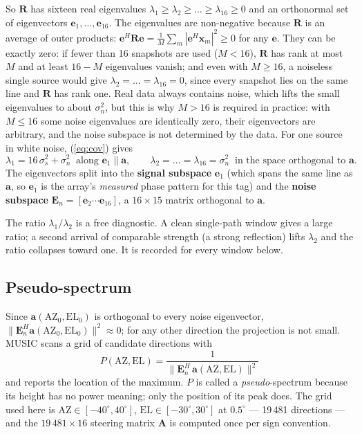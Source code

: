 \documentclass[11pt,a4paper]{article}
\newcommand{\vect}[1]{\mathbf{#1}}
\begin{document}
So $\vect R$ has sixteen real eigenvalues $\lambda_1 \ge \lambda_2 \ge \dots \ge \lambda_{16} \ge 0$ and an orthonormal set of eigenvectors $\vect e_1, \dots, \vect e_{16}$. The eigenvalues are non-negative because $\vect R$ is an average of outer products: $\vect e^H\vect R\vect e = \frac1M\sum_m|\vect e^H\vect x_m|^2 \ge 0$ for any $\vect e$. They can be exactly zero: if fewer than 16 snapshots are used ($M < 16$), $\vect R$ has rank at most $M$ and at least $16-M$ eigenvalues vanish; and even with $M \ge 16$, a noiseless single source would give $\lambda_2 = \dots = \lambda_{16} = 0$, since every snapshot lies on the same line and $\vect R$ has rank one. Real data always contains noise, which lifts the small eigenvalues to about $\sigma_n^2$, but this is why $M > 16$ is required in practice: with $M \le 16$ some noise eigenvalues are identically zero, their eigenvectors are arbitrary, and the noise subspace is not determined by the data. For one source in white noise, (\ref{eq:cov}) gives
\[
  \lambda_1 = 16\,\sigma_s^2 + \sigma_n^2 \ \text{ along } \vect e_1 \parallel \vect a,
  \qquad
  \lambda_2 = \dots = \lambda_{16} = \sigma_n^2 \ \text{ in the space orthogonal to } \vect a.
\]
The eigenvectors split into the \textbf{signal subspace} $\vect e_1$ (which spans the same line as $\vect a$, so $\vect e_1$ is the array's \emph{measured} phase pattern for this tag) and the \textbf{noise subspace} $\vect E_n = [\vect e_2 \cdots \vect e_{16}]$, a $16\times 15$ matrix orthogonal to $\vect a$.

The ratio $\lambda_1/\lambda_2$ is a free diagnostic. A clean single-path window gives a large ratio; a second arrival of comparable strength (a strong reflection) lifts $\lambda_2$ and the ratio collapses toward one. It is recorded for every window below.

\subsection{Pseudo-spectrum}
Since $\vect a(\mathrm{AZ}_0, \mathrm{EL}_0)$ is orthogonal to every noise eigenvector, $\|\vect E_n^H\vect a(\mathrm{AZ}_0, \mathrm{EL}_0)\|^2 \approx 0$; for any other direction the projection is not small. MUSIC scans a grid of candidate directions with
\begin{equation}
  P(\mathrm{AZ}, \mathrm{EL}) = \frac{1}{\|\vect E_n^{H}\,\vect a(\mathrm{AZ}, \mathrm{EL})\|^2}
  \label{eq:music}
\end{equation}
and reports the location of the maximum. $P$ is called a \emph{pseudo}-spectrum because its height has no power meaning; only the position of its peak does. The grid used here is $\mathrm{AZ} \in [-40^\circ, 40^\circ]$, $\mathrm{EL} \in [-30^\circ, 30^\circ]$ at $0.5^\circ$ --- 19\,481 directions --- and the $19\,481\times 16$ steering matrix $\vect A$ is computed once per sign convention.
\end{document}
